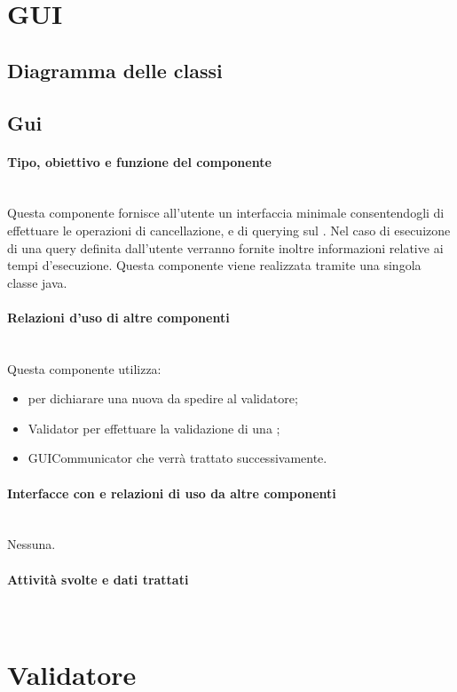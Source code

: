 \documentclass[11pt,titlepage,a4paper]{report}
\begin{document}
\section{GUI}
\subsection{Diagramma delle classi}
\subsection{Gui}
\paragraph{Tipo, obiettivo e funzione del componente}\\
Questa componente fornisce all'utente un interfaccia minimale consentendogli di effettuare le operazioni di cancellazione, e di querying sul \re.
Nel caso di esecuizone di una query definita dall'utente verranno fornite inoltre informazioni relative ai tempi d'esecuzione.
Questa componente viene realizzata tramite una singola classe java.
\paragraph{Relazioni d'uso di altre componenti}\\
Questa componente utilizza:
\begin{itemize}
 \item \BR per dichiarare una nuova \br da spedire al validatore;
 \item Validator per effettuare la validazione di una \br;
 \item GUICommunicator che verr\`a trattato successivamente.
\end{itemize}
\paragraph{Interfacce con e relazioni di uso da altre componenti}\\
Nessuna.
\paragraph{Attivit\`a svolte e dati trattati}\\

\section{Validatore}
\end{document}
